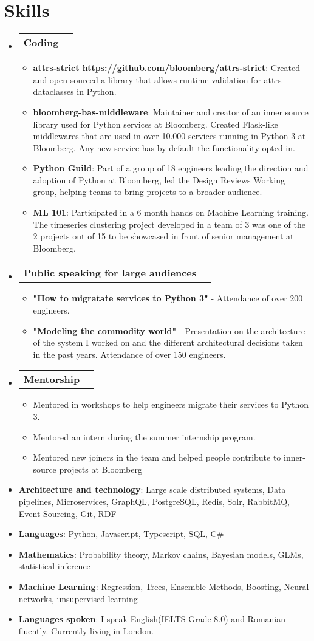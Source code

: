 \documentclass[letterpaper,11pt]{article}
\makeatletter
\newcommand{\resumeItem}[2]{
  \item\small{
    \textbf{#1}{: #2 \vspace{-1pt}}
  }
}
\newcommand{\workItem}[2]{
  \item\small{
    \textbf{#1}{#2 \vspace{-0.6pt}}
  }
}
\newcommand{\resumeCoding}[1]{
  \vspace{-1pt}\item
    \begin{tabular*}{0.97\textwidth}{l@{\extracolsep{\fill}}r}
      \textbf{#1} \\      
    \end{tabular*}\vspace{-5pt}
}
\newcommand{\resumeSubHeadingListStart}{\begin{itemize}[leftmargin=*]}
\newcommand{\resumeSubHeadingListEnd}{\end{itemize}}
\newcommand{\resumeItemListStart}{\begin{itemize}}
\newcommand{\resumeItemListEnd}{\end{itemize}\vspace{-4.6pt}}
\makeatother
\begin{document}
\section{Skills}
 \resumeSubHeadingListStart
    \resumeCoding {Coding}
      \resumeItemListStart
        \resumeItem {attrs-strict https://github.com/bloomberg/attrs-strict}
        {Created and open-sourced a library that allows runtime validation for attrs dataclasses in Python.}
        \resumeItem {bloomberg-bas-middleware}
        {Maintainer and creator of an inner source library used for Python services at Bloomberg. Created Flask-like middlewares that are used in over 10.000 services running in Python 3 at Bloomberg. Any new service has by default the functionality opted-in.}
        \resumeItem {Python Guild}
        {Part of a group of 18 engineers leading the direction and adoption of Python at Bloomberg, led the Design Reviews Working group, helping teams to bring projects to a broader audience.}
        \resumeItem {ML 101}
        {Participated in a 6 month hands on Machine Learning training. The timeseries clustering project developed in a team of 3 was one of the 2 projects out of 15 to be showcased in front of senior management at Bloomberg.}  
      \resumeItemListEnd
    \resumeCoding {Public speaking for large audiences}
      \resumeItemListStart
        \workItem{}
        {\textbf{"How to migratate services to Python 3"} -  Attendance of over 200 engineers.}
        \workItem{}
        {\textbf{"Modeling the commodity world"} - Presentation on the architecture of the system I worked on and the different architectural decisions taken in the past years. Attendance of over 150 engineers.}
      \resumeItemListEnd
    \resumeCoding {Mentorship}
      \resumeItemListStart
        \workItem{}
        {Mentored in workshops to help engineers migrate their services to Python 3.}
        \workItem{}
        {Mentored an intern during the summer internship program.}
        \workItem{}
        {Mentored new joiners in the team and helped people contribute to inner-source projects at Bloomberg}
      \resumeItemListEnd
   \item{
     \textbf{Architecture and technology}{: Large scale distributed systems, Data pipelines, Microservices, GraphQL, PostgreSQL, Redis, Solr, RabbitMQ, Event Sourcing, Git, RDF}
   }
   \item{
     \textbf{Languages}{: Python, Javascript, Typescript, SQL, C\#}
   }
   \item{
     \textbf{Mathematics}{: Probability theory, Markov chains, Bayesian models, GLMs, statistical inference}
   }
   \item{
     \textbf{Machine Learning}{: Regression, Trees, Ensemble Methods, Boosting, Neural networks, unsupervised learning}
   }
   \item{
     \textbf{Languages spoken}{: I speak English(IELTS Grade 8.0) and Romanian fluently. Currently living in London.}
   }   	
 \resumeSubHeadingListEnd
\end{document}
